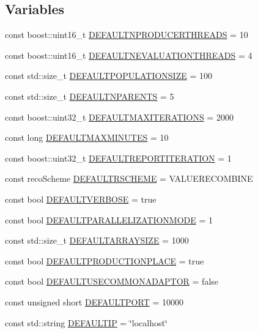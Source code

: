 \subsection*{Variables}
\begin{DoxyCompactItemize}
\item 
const boost::uint16\_\-t \hyperlink{namespaceGem_1_1Geneva_a505a99cdd13909343ea78ab3bdf56474}{DEFAULTNPRODUCERTHREADS} = 10
\item 
const boost::uint16\_\-t \hyperlink{namespaceGem_1_1Geneva_a86f3fe2eb8311d0a9b5c18a32c8ee4f1}{DEFAULTNEVALUATIONTHREADS} = 4
\item 
const std::size\_\-t \hyperlink{namespaceGem_1_1Geneva_a09727ec1a0c3212b45a43896ba422151}{DEFAULTPOPULATIONSIZE} = 100
\item 
const std::size\_\-t \hyperlink{namespaceGem_1_1Geneva_a7ba466fb273415c31b26532094f2dd51}{DEFAULTNPARENTS} = 5
\item 
const boost::uint32\_\-t \hyperlink{namespaceGem_1_1Geneva_a71dd5f6f26fa4f040b16cc729074f219}{DEFAULTMAXITERATIONS} = 2000
\item 
const long \hyperlink{namespaceGem_1_1Geneva_a84c4227f18d85106f2377e8f5cbddf4d}{DEFAULTMAXMINUTES} = 10
\item 
const boost::uint32\_\-t \hyperlink{namespaceGem_1_1Geneva_a2b3f870846aa6ccf4502b14e837707d4}{DEFAULTREPORTITERATION} = 1
\item 
const recoScheme \hyperlink{namespaceGem_1_1Geneva_abf07d2c9bf8cc79475a14f410e435cd0}{DEFAULTRSCHEME} = VALUERECOMBINE
\item 
const bool \hyperlink{namespaceGem_1_1Geneva_acfa46336c5707f08a2ef1e87fde2ba4d}{DEFAULTVERBOSE} = true
\item 
const bool \hyperlink{namespaceGem_1_1Geneva_a0d079f912cda83149347effa10cc7039}{DEFAULTPARALLELIZATIONMODE} = 1
\item 
const std::size\_\-t \hyperlink{namespaceGem_1_1Geneva_ad46712aab7136ab7e747ea8860ab46ff}{DEFAULTARRAYSIZE} = 1000
\item 
const bool \hyperlink{namespaceGem_1_1Geneva_ae70305897c4fb0100476012f61c32ae9}{DEFAULTPRODUCTIONPLACE} = true
\item 
const bool \hyperlink{namespaceGem_1_1Geneva_ae66444afbff6f0454a6f7087d0b9ee0a}{DEFAULTUSECOMMONADAPTOR} = false
\item 
const unsigned short \hyperlink{namespaceGem_1_1Geneva_ab35a5c233444f13095b80a36270de007}{DEFAULTPORT} = 10000
\item 
const std::string \hyperlink{namespaceGem_1_1Geneva_a06037b35202b3efd9e20000d566bd790}{DEFAULTIP} = \char`\"{}localhost\char`\"{}

\end{DoxyCompactItemize}
